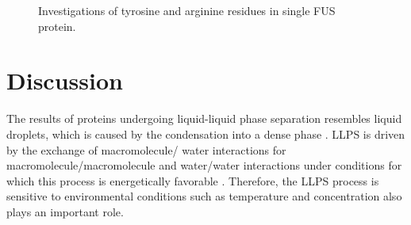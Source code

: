 \documentclass[12ptr]{article}
\begin{document}
\begin{figure}[!ht]
    \centering
    \qquad
    \caption {\small Investigations of tyrosine and arginine residues in single FUS protein. }
    \label{fig:arg_tyr}
\end{figure}




\newpage

\section{Discussion}
The results of proteins undergoing liquid-liquid phase separation resembles liquid droplets, which is caused by the condensation into a dense phase \cite{Alberti_19}. LLPS is driven by the exchange of macromolecule/ 
water interactions for macromolecule/macromolecule and water/water interactions under conditions for which this process is energetically favorable \cite{Alberti_19}. Therefore, the LLPS process is sensitive to environmental conditions such as temperature and concentration also plays an important role. \\[0.01cm]
\end{document}
